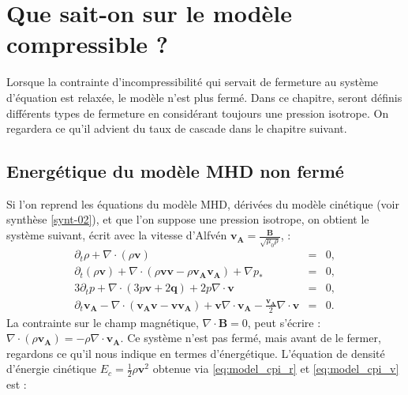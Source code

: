 \chapter{Que sait-on sur le modèle compressible ?}
\renewcommand\partie{\Partie\ Chapitre \thechapter}
\label{ch-12}

\minitoc  

\bigskip

Lorsque la contrainte d'incompressibilité qui servait de fermeture au système d'équation est relaxée, le modèle n'est plus fermé. Dans ce chapitre, seront définis différents types de fermeture en considérant toujours une pression isotrope. On regardera ce qu'il advient du taux de cascade dans le chapitre suivant.   

\section{Energétique du modèle \acs{MHD} non fermé}
\label{sec-121}
Si l'on reprend les équations du modèle \acs{MHD}, dérivées du modèle cinétique (voir synthèse \ref{synt-02}), et que l'on suppose une pression isotrope, on obtient le système suivant, écrit avec la vitesse d'Alfvén $\boldsymbol{v_A}=\frac{\boldsymbol{B}}{\sqrt{\mu_0\rho}}$, : 
\begin{eqnarray}
\partial_t \rho + \nabla \cdot \left(\rho \boldsymbol{v}\right) &=& 0 \label{eq:model_cpi_r}, \\
\partial_t \left(\rho \boldsymbol{v}\right) + \nabla \cdot \left(\rho \boldsymbol{v}\boldsymbol{v} - \rho \boldsymbol{v_A}\boldsymbol{v_A}\right) +  \nabla p_*  &=& 0 \label{eq:model_cpi_v}, \\
3 \partial_t p + \nabla \cdot \left( 3 p\boldsymbol{v} + 2\boldsymbol{q}\right) + 2 p \nabla \cdot \boldsymbol{v} & =& 0 \label{eq:model_cpi_p}, \\
\partial_t \boldsymbol{v_A} -  \nabla \cdot \left(\boldsymbol{v_A}\boldsymbol{v} - \boldsymbol{v}\boldsymbol{v_A}\right) +  \boldsymbol{v}  \nabla \cdot \boldsymbol{v_A} -  \frac{\boldsymbol{v_A}}{2}  \nabla \cdot \boldsymbol{v} &=& 0 .\label{eq:model_cpi_b}
\end{eqnarray}
La contrainte sur le champ magnétique, $\nabla \cdot \boldsymbol{B}=0$, peut s'écrire : $\nabla \cdot \left(\rho \boldsymbol{v_A}\right) = - \rho \nabla \cdot \boldsymbol{v_A} $.
Ce système n'est pas fermé, mais avant de le fermer, regardons ce qu'il nous indique en termes d'énergétique.  
L'équation de densité d'énergie cinétique $E_c = \frac{1}{2}\rho \boldsymbol{v}^2$ obtenue via \eqref{eq:model_cpi_r} et \eqref{eq:model_cpi_v} est :
